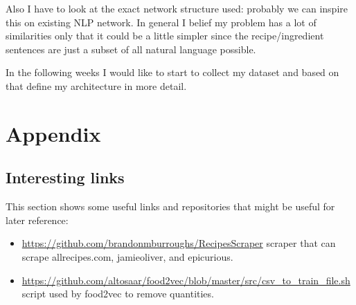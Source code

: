 \documentclass[a4paper]{scrartcl}
\begin{document}
Also I have to look at the exact network structure used: probably we can inspire this on existing NLP network. In general I belief my problem has a lot of similarities only that it could be a little simpler since the recipe/ingredient sentences are just a subset of all natural language possible. 

In the following weeks I would like to start to collect my dataset and based on that define my architecture in more detail. 



\section{Appendix}
\subsection{Interesting links}
This section shows some useful links and repositories that might be useful for later reference:
\begin{itemize}
\item \url{https://github.com/brandonmburroughs/RecipesScraper} scraper that can scrape allrecipes.com, jamieoliver, and epicurious.
\item \url{https://github.com/altosaar/food2vec/blob/master/src/csv\_to\_train\_file.sh} script used by food2vec to remove quantities. 
\end{itemize}
\end{document}
